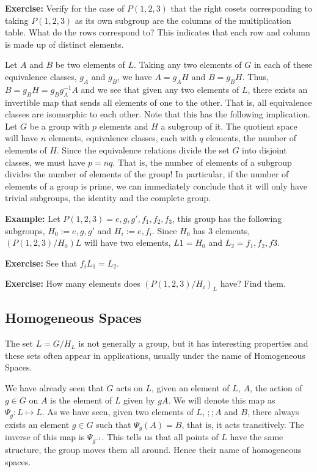 \textbf{Exercise:} Verify for the case of $P(1,2,3)$ that the right cosets corresponding to taking $P(1,2,3)$ as its own subgroup are the columns of the multiplication table. What do the rows correspond to? This indicates that each row and column is made up of distinct elements.

Let $A$ and $B$ be two elements of $L$. Taking any two elements of $G$ in each of these equivalence classes, $g_{A}$ and $g_{B}$, we have $A=g_{A}H$ and $B=g_{B}H$. Thus, $B=g_{B}H = g_{B}g^{-1}_{A}A$ and we see that given any two elements of $L$, there exists an invertible map that sends all elements of one to the other. That is, all equivalence classes are isomorphic to each other. Note that this has the following implication. Let $G$ be a group with $p$ elements and $H$ a subgroup of it. The quotient space will have $n$ elements, equivalence classes, each with $q$ elements, the number of elements of $H$. Since the equivalence relations divide the set $G$ into disjoint classes, we must have $p=nq$. That is, the number of elements of a subgroup divides the number of elements of the group! In particular, if the number of elements of a group is prime, we can immediately conclude that it will only have trivial subgroups, the identity and the complete group.

\textbf{Example:} Let $P(1,2,3)={e,g,g',f_{1},f_{2},f_{3}}$, this group has the following subgroups, $H_{0}:={e,g,g'}$ and $H_{i}:={e,f_{i}}$. Since $H_{0}$ has 3 elements, $(P(1,2,3)/H_{0}){L}$ will have two elements, $L{1}=H_{0}$ and $L_{2}={f_{1},f_{2},f{3}}$.

\textbf{Exercise:} See that $f_{i}L_{1}=L_{2}$.

\textbf{Exercise:} How many elements does $(P(1,2,3)/H_{i})_{L}$ have? Find them.

\subsection{Homogeneous Spaces}

The set $L=G/H_{L}$ is not generally a group, but it has interesting properties and these sets often 
appear in applications, usually under the name of Homogeneous Spaces.

We have already seen that $G$ acts on $L$, given an element of $L$, $A$, the action of $g \in G$ on $A$ 
is the element of $L$ given by $gA$. We will denote this map as $\Psi_{g}:L \mapsto L$. 
As we have seen, given two elements of $L$, $;;A$ and $B$, there always exists an element $g \in G$ 
such that $\Psi_{g}(A)=B$, that is, it acts transitively. The inverse of this map is $\Psi_{g^{-1}}$. 
This tells us that all points of $L$ have the same structure, the group moves them all around. 
Hence their name of homogeneous spaces.

